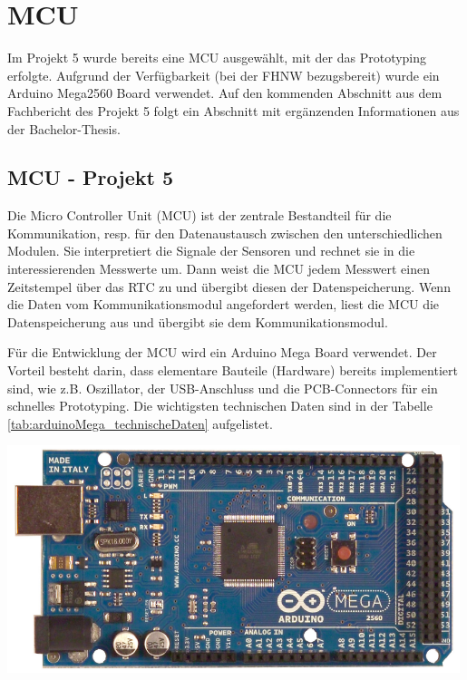 \chapter{MCU}
\label{chap:MCU}
Im Projekt 5 wurde bereits eine MCU ausgewählt, mit der das Prototyping erfolgte. Aufgrund der Verfügbarkeit (bei der FHNW bezugsbereit) wurde ein Arduino Mega2560 Board verwendet. Auf den kommenden Abschnitt aus dem Fachbericht des Projekt 5 folgt ein Abschnitt mit ergänzenden Informationen aus der Bachelor-Thesis.

\section{MCU - Projekt 5}
Die Micro Controller Unit (MCU) ist der zentrale Bestandteil für die Kommunikation, resp. für den Datenaustausch zwischen den unterschiedlichen Modulen. Sie interpretiert die Signale der Sensoren und rechnet sie in die interessierenden Messwerte um. Dann weist die MCU jedem Messwert einen Zeitstempel über das RTC zu und übergibt diesen der Datenspeicherung. Wenn die Daten vom Kommunikationsmodul angefordert werden, liest die MCU die Datenspeicherung aus und übergibt sie dem Kommunikationsmodul.\\

{\begin{minipage}[b][130pt][t]{0.5\textwidth}
Für die Entwicklung der MCU wird ein Arduino Mega Board verwendet. Der Vorteil besteht darin, dass elementare Bauteile (Hardware) bereits implementiert sind, wie z.B. Oszillator, der USB-Anschluss und die PCB-Connectors für ein schnelles Prototyping. Die wichtigsten technischen Daten sind in der Tabelle \ref{tab:arduinoMega_technischeDaten} aufgelistet.\\
\end{minipage}}
\hfill
{\begin{minipage}[b][130pt][t]{0.49\textwidth}
\centering
\includegraphics[width=0.99\textwidth]{graphics/MCU/arduino_mega.png}
\label{fig:arduinoMega}
\end{minipage}}

